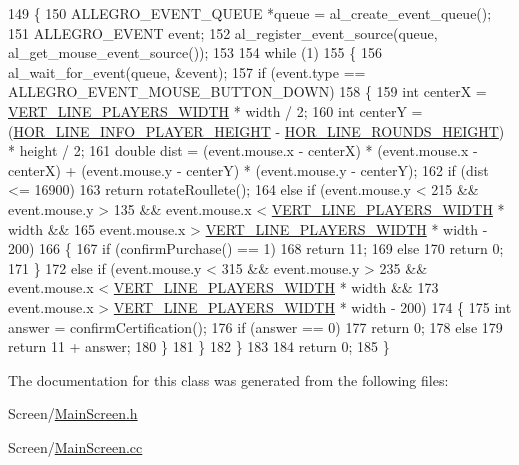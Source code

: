 \begin{DoxyCode}
149 \{
150     ALLEGRO\_EVENT\_QUEUE *queue = al\_create\_event\_queue();
151     ALLEGRO\_EVENT event;
152     al\_register\_event\_source(queue, al\_get\_mouse\_event\_source());
153 
154     \textcolor{keywordflow}{while} (1)
155     \{
156         al\_wait\_for\_event(queue, &event);
157         \textcolor{keywordflow}{if} (event.type == ALLEGRO\_EVENT\_MOUSE\_BUTTON\_DOWN)
158         \{
159             \textcolor{keywordtype}{int} centerX = \hyperlink{MainScreen_8h_a95248267b1e9860a49b38b91d6060ac3}{VERT\_LINE\_PLAYERS\_WIDTH} * width / 2;
160             \textcolor{keywordtype}{int} centerY = (\hyperlink{MainScreen_8h_a317b5109da7c376133ac189c84b42640}{HOR\_LINE\_INFO\_PLAYER\_HEIGHT} - 
      \hyperlink{MainScreen_8h_a7e18b3decda36fa1ea88693a2e3db612}{HOR\_LINE\_ROUNDS\_HEIGHT}) * height / 2;
161             \textcolor{keywordtype}{double} dist = (\textcolor{keyword}{event}.mouse.x - centerX) * (event.mouse.x - centerX) + (\textcolor{keyword}{event}.mouse.y - centerY)
       * (event.mouse.y - centerY);
162             \textcolor{keywordflow}{if} (dist <= 16900)
163                 \textcolor{keywordflow}{return} rotateRoullete();
164             \textcolor{keywordflow}{else} \textcolor{keywordflow}{if} (event.mouse.y < 215 && event.mouse.y > 135 && event.mouse.x < 
      \hyperlink{MainScreen_8h_a95248267b1e9860a49b38b91d6060ac3}{VERT\_LINE\_PLAYERS\_WIDTH} * width && 
165                 event.mouse.x > \hyperlink{MainScreen_8h_a95248267b1e9860a49b38b91d6060ac3}{VERT\_LINE\_PLAYERS\_WIDTH} * width - 200)
166             \{
167                 \textcolor{keywordflow}{if} (confirmPurchase() == 1)
168                     \textcolor{keywordflow}{return} 11;
169                 \textcolor{keywordflow}{else}
170                     \textcolor{keywordflow}{return} 0;
171             \}
172             \textcolor{keywordflow}{else} \textcolor{keywordflow}{if} (event.mouse.y < 315 && event.mouse.y > 235 && event.mouse.x < 
      \hyperlink{MainScreen_8h_a95248267b1e9860a49b38b91d6060ac3}{VERT\_LINE\_PLAYERS\_WIDTH} * width && 
173                 event.mouse.x > \hyperlink{MainScreen_8h_a95248267b1e9860a49b38b91d6060ac3}{VERT\_LINE\_PLAYERS\_WIDTH} * width - 200)
174             \{
175                 \textcolor{keywordtype}{int} answer = confirmCertification();
176                 \textcolor{keywordflow}{if} (answer == 0)
177                     \textcolor{keywordflow}{return} 0;
178                 \textcolor{keywordflow}{else}
179                     \textcolor{keywordflow}{return} 11 + answer;
180             \}
181         \}
182     \}
183 
184     \textcolor{keywordflow}{return} 0;
185 \}
\end{DoxyCode}


The documentation for this class was generated from the following files\-:\begin{DoxyCompactItemize}
\item 
Screen/\hyperlink{MainScreen_8h}{Main\-Screen.\-h}\item 
Screen/\hyperlink{MainScreen_8cc}{Main\-Screen.\-cc}\end{DoxyCompactItemize}
